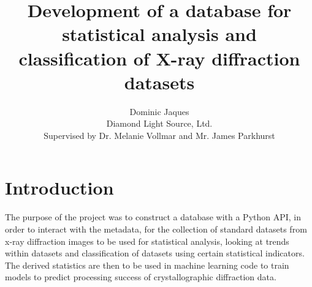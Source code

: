 \documentclass[11pt, a4paper]{article}
\title{Development of a database for statistical analysis and classification of X-ray diffraction datasets}
\author{Dominic Jaques\\ Diamond Light Source, Ltd.\\ Supervised by Dr. Melanie Vollmar and Mr. James Parkhurst}
\begin{document}
\maketitle
\section{Introduction}
The purpose of the project was to construct a database with a Python API, in order to interact with the metadata, for the collection of standard datasets from x-ray diffraction images to be used for statistical analysis, looking at trends within datasets and classification of datasets using certain statistical indicators. The derived statistics are then to be used in machine learning code to train models to predict processing success of crystallographic diffraction data. 
\vspace{5mm}
\end{document}
